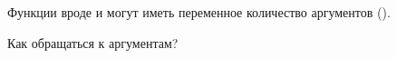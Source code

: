 
Функции вроде \printf и \scanf могут иметь переменное количество аргументов ().

Как обращаться к аргументам?






